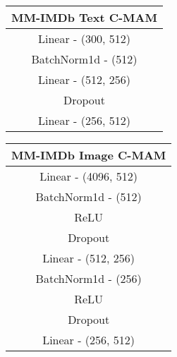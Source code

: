 \begin{table}[h!]
\begin{minipage}[t]{0.49\textwidth}
    \end{minipage}%
    \hfill
    \begin{minipage}[t]{0.2\textwidth}
    \centering
    \vspace{0pt} %
    \begin{tabular}{clllll}
        \hline
        \multicolumn{6}{c}{\textbf{MM-IMDb Text C-MAM}} \\ \hline
        \multicolumn{6}{c}{Linear - (300, 512)}         \\ \hline
        \multicolumn{6}{c}{BatchNorm1d - (512)}         \\ \hline
        \multicolumn{6}{c}{Linear - (512, 256)}         \\ \hline
        \multicolumn{6}{c}{Dropout}                     \\ \hline
        \multicolumn{6}{c}{Linear - (256, 512)}         \\ \hline
        \end{tabular}%
    \end{minipage}%
    \hfill
    \begin{minipage}[t]{0.2\textwidth}
    \centering
    \vspace{0pt} %
    \begin{tabular}{clllll}
        \hline
        \multicolumn{6}{c}{\textbf{MM-IMDb Image C-MAM}} \\ \hline
        \multicolumn{6}{c}{Linear - (4096, 512)}         \\ \hline
        \multicolumn{6}{c}{BatchNorm1d - (512)}          \\ \hline
        \multicolumn{6}{c}{ReLU}                         \\ \hline
        \multicolumn{6}{c}{Dropout}                      \\ \hline
        \multicolumn{6}{c}{Linear - (512, 256)}          \\ \hline
        \multicolumn{6}{c}{BatchNorm1d - (256)}          \\ \hline
        \multicolumn{6}{c}{ReLU}                         \\ \hline
        \multicolumn{6}{c}{Dropout}                      \\ \hline
        \multicolumn{6}{c}{Linear - (256, 512)}          \\ \hline
        \end{tabular}%
    \end{minipage}%
    \hfill
\end{table}


